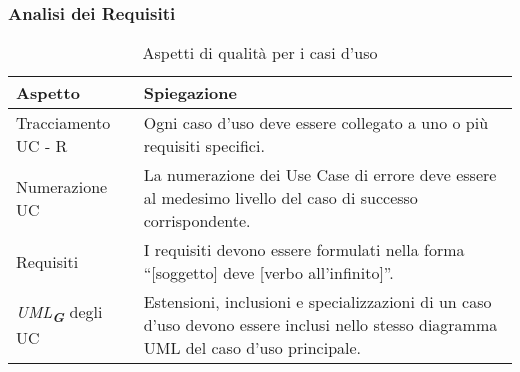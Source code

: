 \subsubsection{Analisi dei Requisiti}
\begin{table}[h!]
    \centering
    \renewcommand{\arraystretch}{1.5} %
    \begin{tabularx}{\textwidth}{|p{}|X|}
    \hline
    \rowcolor[HTML]{FFD700}
    \textbf{Aspetto} & \textbf{Spiegazione} \\ \hline
    Tracciamento UC - R & Ogni caso d'uso deve essere collegato a uno o più requisiti specifici. \\ \hline
    Numerazione UC & La numerazione dei Use Case di errore deve essere al medesimo livello del caso di successo corrispondente. \\ \hline
    Requisiti & I requisiti devono essere formulati nella forma “[soggetto] deve [verbo all'infinito]”. \\ \hline
    \emph{UML}\textsubscript{\textit{\textbf{G}}} degli UC & Estensioni, inclusioni e specializzazioni di un caso d'uso devono essere inclusi nello stesso diagramma UML del caso d'uso principale. \\ \hline
    \end{tabularx}
    \caption{Aspetti di qualità per i casi d'uso}
\end{table}
